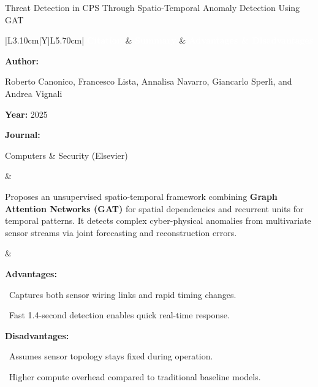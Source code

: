 \documentclass[aspectratio=169,10pt]{beamer}
\newcommand{\lrhdr}{%
  \rowcolor{prismNavy}%
  {\scriptsize\textcolor{white}{\textbf{Citation}}} &
  {\scriptsize\textcolor{white}{\textbf{Summary}}} &
  {\scriptsize\textcolor{white}{\textbf{Advantages \& Disadvantages}}} \\}
\begin{document}
\begin{frame}[t]{Threat Detection in CPS Through Spatio-Temporal Anomaly Detection Using GAT}
\vspace{-0.30em}
{\footnotesize\setlength{\tabcolsep}{3.5pt}\renewcommand{\arraystretch}{1.10}
\begin{tabularx}{\textwidth}{|L{3.10cm}|Y|L{5.70cm}|}
\hline\lrhdr\hline
\begin{minipage}[t]{\linewidth}\fontsize{7.2pt}{9.2pt}\raggedright\selectfont
\textbf{Author:}\par
Roberto Canonico, Francesco Lista, Annalisa Navarro, Giancarlo Sperl{\'\i}, and Andrea Vignali\par\vspace{4pt}
\textbf{Year:} 2025\par\vspace{4pt}
\textbf{Journal:}\par
Computers \& Security (Elsevier)\par\vspace{4pt}
\end{minipage}
&
\begin{minipage}[t]{\linewidth}\fontsize{7.2pt}{9.2pt}\raggedright\selectfont
Proposes an unsupervised spatio-temporal framework combining \textbf{Graph Attention Networks (GAT)} for spatial dependencies and recurrent units for temporal patterns. It detects complex cyber-physical anomalies from multivariate sensor streams via joint forecasting and reconstruction errors.\par\vspace{4pt}
\end{minipage}
&
\begin{minipage}[t]{\linewidth}\fontsize{7.2pt}{9.0pt}\raggedright\selectfont
\textcolor{strengthGreen}{\textbf{Advantages:}}\par\vspace{1.5pt}
\textbullet~Captures both sensor wiring links and rapid timing changes.\par\vspace{2.0pt}\textbullet~Fast 1.4-second detection enables quick real-time response.\par\vspace{4.0pt}
\textcolor{limitRed}{\textbf{Disadvantages:}}\par\vspace{1.5pt}
\textbullet~Assumes sensor topology stays fixed during operation.\par\vspace{2.0pt}\textbullet~Higher compute overhead compared to traditional baseline models.\par\vspace{4pt}
\end{minipage} \\\hline
\end{tabularx}}
\end{frame}
\end{document}
